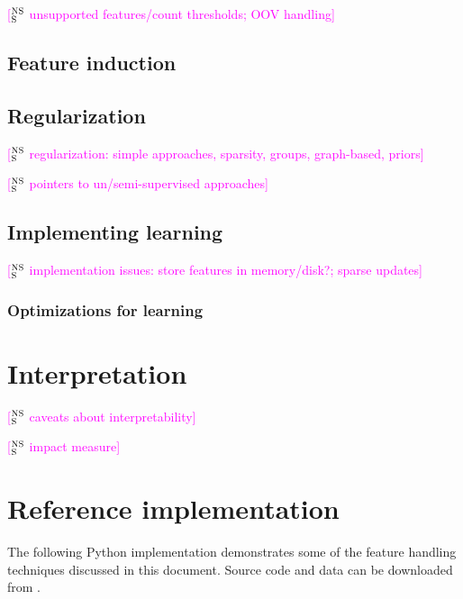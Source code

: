 \documentclass[11pt,letterpaper]{article}
\newcommand{\ensuretext}[1]{#1}
\newcommand{\nssmarker}{\ensuretext{\textcolor{magenta}{\ensuremath{^{\textsc{NS}}_{\textsc{S}}}}}}
\newcommand{\arkcomment}[3]{\ensuretext{\textcolor{#3}{[#1 #2]}}}
\newcommand{\nss}[1]{\arkcomment{\nssmarker}{#1}{magenta}}
\begin{document}
\nss{unsupported features/count thresholds; OOV handling}

\subsection{Feature induction}\label{sec:induction}

\subsection{Regularization}\label{sec:reg}

\nss{regularization: simple approaches, sparsity, groups, graph-based, priors}

\nss{pointers to un/semi-supervised approaches}

\subsection{Implementing learning}

\nss{implementation issues: store features in memory/disk?; sparse updates}
\subsubsection{Optimizations for learning}


\section{Interpretation}\label{sec:interp}

\nss{caveats about interpretability}

\nss{impact measure}


\appendix
\section{Reference implementation}\label{ex}

The following Python implementation demonstrates some of the feature handling techniques discussed in this document.
Source code and data can be downloaded from .





\end{document}
